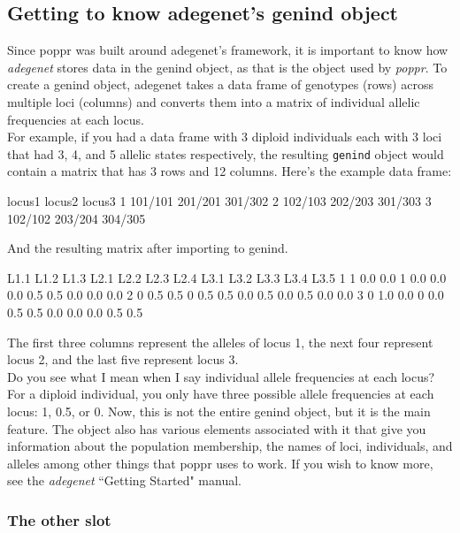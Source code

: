 \documentclass[letterpaper]{article}
\newcommand{\tab}{\hspace*{1em}}
\begin{document}
\subsection{Getting to know adegenet's genind object}

\tab\tab Since poppr was built around adegenet's framework, it is important to know how \textit{adegenet} stores data in the genind object, as that is the object used by \textit{poppr}. To create a genind object, adegenet takes a data frame of genotypes (rows) across multiple loci (columns) and converts them into a matrix of individual allelic frequencies at each locus. \cite{Jombart:2008}\\
For example, if you had a data frame with 3 diploid individuals each with 3 loci that had 3, 4, and 5 allelic states respectively, the resulting \texttt{genind} object would contain a matrix that has 3 rows and 12 columns. 
\noindent Here's the example data frame:
\begin{Schunk}
\begin{Soutput}
   locus1  locus2  locus3
1 101/101 201/201 301/302
2 102/103 202/203 301/303
3 102/102 203/204 304/305
\end{Soutput}
\end{Schunk}
And the resulting matrix after importing to genind.
\begin{Schunk}
\begin{Soutput}
  L1.1 L1.2 L1.3 L2.1 L2.2 L2.3 L2.4 L3.1 L3.2 L3.3 L3.4 L3.5
1    1  0.0  0.0    1  0.0  0.0  0.0  0.5  0.5  0.0  0.0  0.0
2    0  0.5  0.5    0  0.5  0.5  0.0  0.5  0.0  0.5  0.0  0.0
3    0  1.0  0.0    0  0.0  0.5  0.5  0.0  0.0  0.0  0.5  0.5
\end{Soutput}
\end{Schunk}
The first three columns represent the alleles of locus 1, the next four represent locus 2, and the last five represent locus 3.\\
Do you see what I mean when I say individual allele frequencies at each locus? For a diploid individual, you only have three possible allele frequencies at each locus: 1, 0.5, or 0. Now, this is not the entire genind object, but it is the main feature. The object also has various elements associated with it that give you information about the population membership, the names of loci, individuals, and alleles among other things that poppr uses to work. \cite{Jombart:2008} If you wish to know more, see the \textit{adegenet} ``Getting Started" manual. 
\subsubsection{The other slot}
\end{document}
